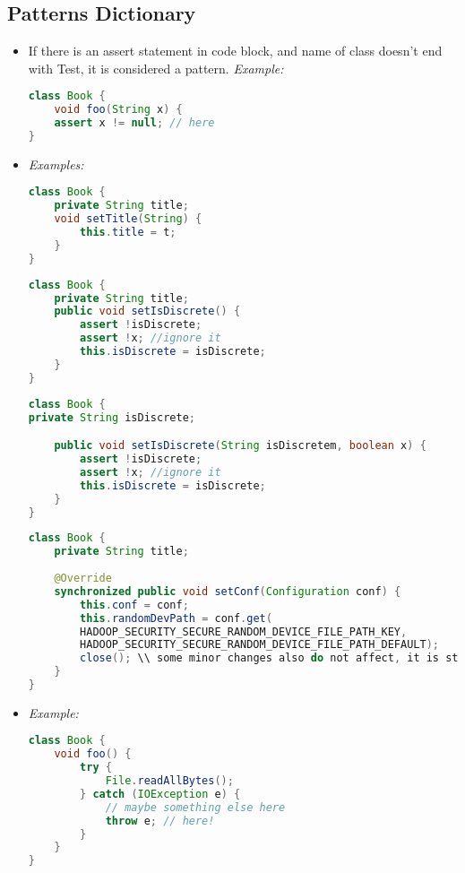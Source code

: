 \subsection*{Patterns Dictionary}

\begin{itemize}
	\item {}
	{If there is an assert statement in code block, and name of class doesn't end with Test, it is considered a pattern.}
	{\it Example:}
\begin{lstlisting}[language=Java]
class Book {
	void foo(String x) {
	assert x != null; // here
}
\end{lstlisting}

	\item {}
	{\it Examples:}
\begin{lstlisting}[language=Java]
class Book {
	private String title;
	void setTitle(String) {
		this.title = t;
	}
}
\end{lstlisting}

\begin{lstlisting}[language=Java]
class Book {
	private String title;
	public void setIsDiscrete() {
		assert !isDiscrete;
		assert !x; //ignore it
		this.isDiscrete = isDiscrete;
	}
}
\end{lstlisting}

\begin{lstlisting}[language=Java]
class Book {
private String isDiscrete;

	public void setIsDiscrete(String isDiscretem, boolean x) {
		assert !isDiscrete;
		assert !x; //ignore it
		this.isDiscrete = isDiscrete;
	}
}
\end{lstlisting}

\begin{lstlisting}[language=Java]
class Book {
	private String title;
	
	@Override
	synchronized public void setConf(Configuration conf) {
		this.conf = conf;
		this.randomDevPath = conf.get(
		HADOOP_SECURITY_SECURE_RANDOM_DEVICE_FILE_PATH_KEY,
		HADOOP_SECURITY_SECURE_RANDOM_DEVICE_FILE_PATH_DEFAULT);
		close(); \\ some minor changes also do not affect, it is still Setter pattern
	}
}
\end{lstlisting}
	
	\item {}
	{\it Example:}
\begin{lstlisting}[language=Java]
class Book {
	void foo() {
		try {
			File.readAllBytes();
		} catch (IOException e) {
			// maybe something else here
			throw e; // here!
		}
	}
}
\end{lstlisting}


\end{itemize}

